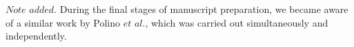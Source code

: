 \documentclass[aps,prl,twocolumn,amsmath,amssymb,nofootinbib,superscriptaddress]{revtex4-1}
\begin{document}


$Note$ $added.$ During the final stages of manuscript preparation, we became aware of a similar work by Polino $et$ $al.$, which was carried out simultaneously and independently.


%

\end{document}
